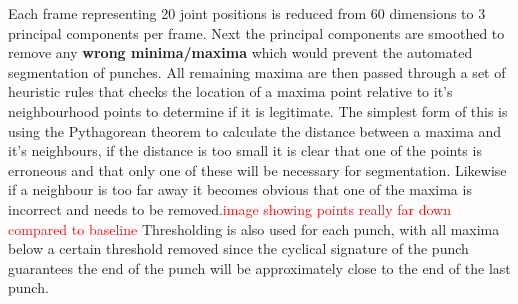 Each frame representing 20 joint positions is reduced from 60 dimensions to 3 principal components per frame. Next the principal components are smoothed to remove any {\bf wrong minima/maxima} which would prevent the automated segmentation of punches. All remaining maxima are then passed through a set of heuristic rules that checks the location of a maxima point relative to it's neighbourhood points to determine if it is legitimate. The simplest form of this is using the Pythagorean theorem to calculate the distance between a maxima and it's neighbours, if the distance is too small it is clear that one of the points is erroneous and that only one of these will be necessary for segmentation. Likewise if a neighbour is too far away it becomes obvious that one of the maxima is incorrect and needs to be removed.\textcolor{red}{image showing points really far down compared to baseline} Thresholding is also used for each punch, with all maxima below a certain threshold removed since the cyclical signature of the punch guarantees the end of the punch will be approximately close to the end of the last punch.
